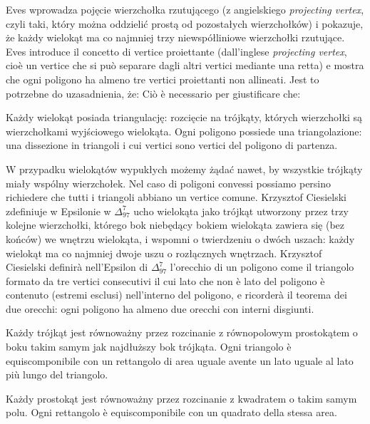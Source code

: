 Eves wprowadza pojęcie wierzchołka rzutującego (z angielskiego \emph{projecting vertex}, czyli taki, który można oddzielić prostą od pozostałych wierzchołków) i pokazuje, że każdy wielokąt ma co najmniej trzy niewspółliniowe wierzchołki rzutujące. %
Eves introduce il concetto di vertice proiettante (dall'inglese \emph{projecting vertex}, cioè un vertice che si può separare dagli altri vertici mediante una retta) e mostra che ogni poligono ha almeno tre vertici proiettanti non allineati. %
Jest to potrzebne do uzasadnienia, że: %
Ciò è necessario per giustificare che: %

\begin{proposition}
    Każdy wielokąt posiada triangulację: rozcięcie na trójkąty, których wierzchołki są wierzchołkami wyjściowego wielokąta. %
    Ogni poligono possiede una triangolazione: una dissezione in triangoli i cui vertici sono vertici del poligono di partenza. %
\end{proposition}

W przypadku wielokątów wypukłych możemy żądać nawet, by wszystkie trójkąty miały wspólny wierzchołek. %
Nel caso di poligoni convessi possiamo persino richiedere che tutti i triangoli abbiano un vertice comune. %
Krzysztof Ciesielski zdefiniuje w Epsilonie w $\Delta_{97}^7$ ucho wielokąta jako trójkąt utworzony przez trzy kolejne wierzchołki, którego bok niebędący bokiem wielokąta zawiera się (bez końców) we wnętrzu wielokąta, i wspomni o twierdzeniu o dwóch uszach: każdy wielokąt ma co najmniej dwoje uszu o rozłącznych wnętrzach. %
Krzysztof Ciesielski definirà nell'Epsilon di $\Delta_{97}^7$ l'orecchio di un poligono come il triangolo formato da tre vertici consecutivi il cui lato che non è lato del poligono è contenuto (estremi esclusi) nell'interno del poligono, e ricorderà il teorema dei due orecchi: ogni poligono ha almeno due orecchi con interni disgiunti. %

\begin{proposition}
    Każdy trójkąt jest równoważny przez rozcinanie z równopolowym prostokątem o boku takim samym jak najdłuższy bok trójkąta. %
    Ogni triangolo è equiscomponibile con un rettangolo di area uguale avente un lato uguale al lato più lungo del triangolo. %
\end{proposition}

\begin{corollary}
    Każdy prostokąt jest równoważny przez rozcinanie z kwadratem o takim samym polu. %
    Ogni rettangolo è equiscomponibile con un quadrato della stessa area. %
\end{corollary}

